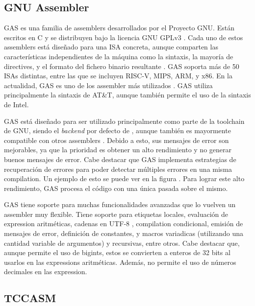 \subsection{GNU Assembler}

\gls{GAS} \parencite{GNUas} es una familia de \glspl{assembler} desarrollados
por el Proyecto GNU. Están escritos en C y se distribuyen bajo la licencia GNU
GPLv3 \parencite{gpl}. Cada uno de estos \glspl{assembler} está diseñado para
una \gls{ISA} concreta, aunque comparten las características independientes de
la máquina como la sintaxis, la mayoría de \glspl{directive}, y el formato del
fichero binario resultante \parencite{as-manual}. \gls{GAS} soporta más de 50
\glspl{ISA} distintas, entre las que se incluyen RISC-V, MIPS, ARM, y x86. En la
actualidad, \gls{GAS} es uno de los \gls{assembler} más utilizados
\parencite{assembler-usage}. \gls{GAS} utiliza principalmente la sintaxis de
AT\&T, aunque también permite el uso de la sintaxis de Intel.

\gls{GAS} está diseñado para ser utilizado principalmente como parte de la
\gls{toolchain} de GNU, siendo el \textit{backend} por defecto de ,
aunque también es mayormente compatible con otros \glspl{assembler}
\parencite{as-manual}. Debido a esto, sus mensajes de error son mejorables, ya
que la prioridad es obtener un alto rendimiento y no generar buenos mensajes de
error. Cabe destacar que \gls{GAS} implementa estrategias de recuperación de
errores para poder detectar múltiples errores en una misma \gls{compilation}. Un
ejemplo de esto se puede ver en la figura . Para lograr
este alto rendimiento, \gls{GAS} procesa el código con una única pasada sobre el
mismo.


\gls{GAS} tiene soporte para muchas funcionalidades avanzadas que lo vuelven un
\gls{assembler} muy flexible. Tiene soporte para etiquetas locales, evaluación
de \gls{expression} aritméticas, cadenas en UTF-8 \parencite{UTF-8},
\gls{compilation} condicional, emisión de mensajes de error, definición de
constantes, y \glspl{macro} variadicas (utilizando una cantidad variable de
argumentos) y recursivas, entre otros. Cabe destacar que, aunque permite el uso
de \glspl{bigint}, estos se convierten a enteros de 32 bits al usarlos en las
\glspl{expression} aritméticas. Además, no permite el uso de números decimales
en las \gls{expression}.

\subsection{TCCASM}

